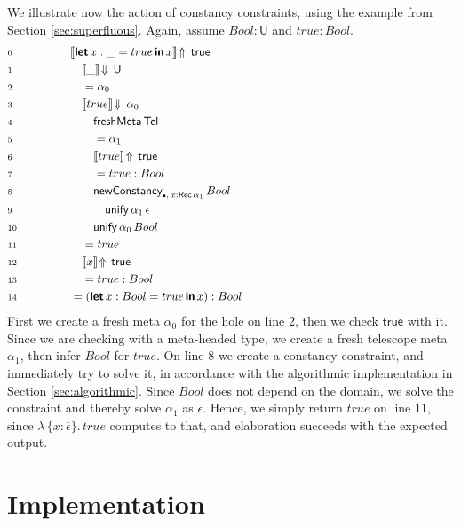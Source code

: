 \documentclass[acmsmall,review,anonymous,prologue,dvipsnames]{acmart}\settopmatter{printfolios=true,printccs=false,printacmref=false}
\newcommand{\slet}{\boldsymbol{\mathsf{let}}}
\renewcommand{\sin}{\boldsymbol{\mathsf{in}}}
\renewcommand{\U}{\mathsf{U}}
\newcommand{\emptycon}{\scaleobj{.75}\bullet}
\newcommand{\unify}{\mathsf{unify}}
\newcommand{\echeckt}[2]{\llbracket#1\rrbracket\!\Downarrow\,#2}
\newcommand{\einfert}[2]{\llbracket#1\rrbracket\!\Uparrow\,#2}
\newcommand{\true}{\mathsf{true}}
\newcommand{\Tel}{\mathsf{Tel}}
\newcommand{\Rec}{\mathsf{Rec}}
\newcommand{\ol}[1]{\overline{#1}}
\theoremstyle{remark}
\begin{document}
\begin{example}
We illustrate now the action of constancy constraints, using the example from
Section \ref{sec:superfluous}. Again, assume $Bool : \U$ and $true : Bool$.
\begin{alignat*}{3}
& \scriptstyle{0}\qquad\qquad && \einfert{\slet\,x : \_ = true\,\sin\,x}{\true}
      \hspace{21em}\\
& \scriptstyle{1} && \quad \echeckt{\_}{\U}\\
& \scriptstyle{2} && \quad = \alpha_0\\
& \scriptstyle{3} && \quad \echeckt{true}{\alpha_0}\\
& \scriptstyle{4} && \qquad \mathsf{freshMeta}\,\Tel\\
& \scriptstyle{5} && \qquad = \alpha_1\\
& \scriptstyle{6} && \qquad \einfert{true}{\true}\\
& \scriptstyle{7} && \qquad = true : Bool\\
& \scriptstyle{8} && \qquad \mathsf{newConstancy}_{\emptycon,\,x : \Rec\,\alpha_1}\,Bool\\
& \scriptstyle{9} && \qquad\quad \unify\,\alpha_1\,\epsilon\\
& \scriptstyle{10} && \qquad \unify\,\alpha_0\,Bool\\
& \scriptstyle{11} && \quad = true\\
& \scriptstyle{12} && \quad \einfert{x}{\true}\\
& \scriptstyle{13} && \quad = true : Bool\\
& \scriptstyle{14} && = (\slet\,x : Bool = true\,\sin\,x) : Bool
\end{alignat*}
First we create a fresh meta $\alpha_0$ for the hole on line $\scriptstyle{2}$,
then we check $\true$ with it. Since we are checking with a meta-headed type, we
create a fresh telescope meta $\alpha_1$, then infer $Bool$ for $true$. On line
$\scriptstyle{8}$ we create a constancy constraint, and immediately try to solve
it, in accordance with the algorithmic implementation in Section
\ref{sec:algorithmic}. Since $Bool$ does not depend on the domain, we solve the
constraint and thereby solve $\alpha_1$ as $\epsilon$. Hence, we simply return
$true$ on line $\scriptstyle{11}$, since $\lambda\,\{x : \ol{\epsilon}\}.\,true$
computes to that, and elaboration succeeds with the expected output.
\end{example}

\section{Implementation}
\label{sec:impl_and_eval}
\end{document}
